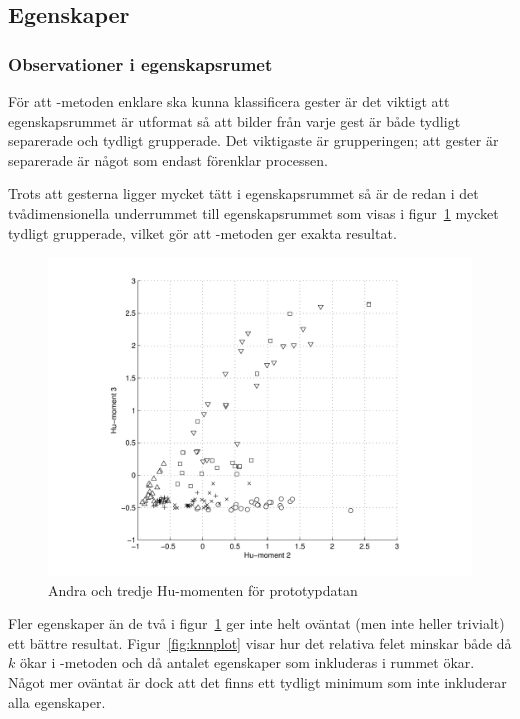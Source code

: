\documentclass[../rapport_MVEX01-11-05]{subfiles}
\begin{document}
\subsection{Egenskaper}\label{sec:resultat_features}


\subsubsection{Observationer i egenskapsrumet}

För att \knn-metoden enklare ska kunna klassificera gester är det viktigt att
egenskapsrummet är utformat så att bilder från varje gest är både tydligt
separerade och tydligt grupperade. Det viktigaste är grupperingen; att gester
är separerade är något som endast förenklar processen.

Trots att gesterna ligger mycket tätt i egenskapsrummet så är de redan i det
tvådimensionella underrummet till egenskapsrummet som visas i figur~\ref{fig:feats1011}
mycket tydligt grupperade, vilket gör att \knn-metoden ger exakta resultat.

\begin{figure}[htb]
  \centering
  \includegraphics[width=\textwidth]{bilder/feats-10+11}
  \caption{Andra och tredje Hu-momenten för prototypdatan}
  \label{fig:feats1011}
\end{figure}

Fler egenskaper än de två i figur~\ref{fig:feats1011} ger inte helt oväntat
(men inte heller trivialt) ett bättre resultat. Figur~\ref{fig:knnplot} visar
hur det relativa felet minskar både då $k$ ökar i \knn-metoden och då antalet
egenskaper som inkluderas i rummet ökar. Något mer oväntat är dock att det
finns ett tydligt minimum som inte inkluderar alla egenskaper.
\end{document}
